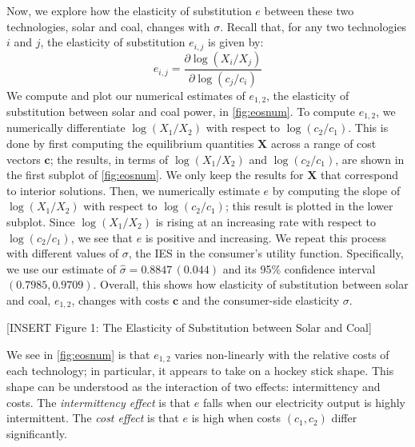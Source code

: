\documentclass[11pt,a4paper,leqno]{extarticle}
\begin{document}
	Now, we explore how the elasticity of substitution $e$ between these two technologies, solar and coal, changes with $\sigma$. Recall that, for any two technologies $i$ and $j$, the elasticity  of substitution $e_{i,j}$ is given by:
	$$e_{i,j} = \frac{\partial \log (X_i/ X_j)}{\partial \log (c_j/c_i)}$$
	We compute and plot our numerical estimates of $e_{1, 2}$, the elasticity of substitution between solar and coal power, in \autoref{fig:eosnum}. To compute $e_{1,2}$, we numerically differentiate $\log(X_1/X_2)$ with respect to $\log(c_2/c_1)$. This is done by first computing the equilibrium quantities $\mathbf{X}$ across a range of cost vectors $\mathbf{c}$; the results, in terms of $\log(X_1/X_2)$ and $\log(c_2/c_1)$, are shown in the first subplot of \autoref{fig:eosnum}. We only keep the results for $\mathbf{X}$ that correspond to interior solutions.  Then,  we numerically estimate $e$ by computing the slope of $\log(X_1/X_2)$ with respect to $\log(c_2/c_1)$; this result is plotted in the lower subplot. Since $\log(X_1/X_2)$ is rising at an increasing rate with respect to $\log(c_2/c_1)$, we see that $e$ is positive and increasing.  We repeat this process with different values of $\sigma$, the IES in the consumer's utility function. Specifically, we use our estimate of $\hat{\sigma} = 0.8847\, (0.044)$ and its 95\%  confidence interval $(0.7985, 0.9709)$. Overall, this shows how elasticity of substitution between solar and coal, $e_{1,2}$, changes with costs $\mathbf{c}$ and the consumer-side elasticity $\sigma$. 
		
	
	\vspace{0.15in}
	\begin{center}
		[INSERT Figure 1: The Elasticity of Substitution between Solar and Coal]
	\end{center}
	\vspace{0.15in}
	
	
	We see in \autoref{fig:eosnum} is that $e_{1,2}$ varies non-linearly with the relative costs of each technology; in particular, it appears to take on a hockey stick shape.  This shape can be understood as the interaction of two effects: intermittency and costs. The \textit{intermittency effect} is that $e$ falls when our electricity output is highly intermittent. The \textit{cost effect} is that $e$ is high when costs $(c_1, c_2)$ differ significantly.
	
\end{document}
